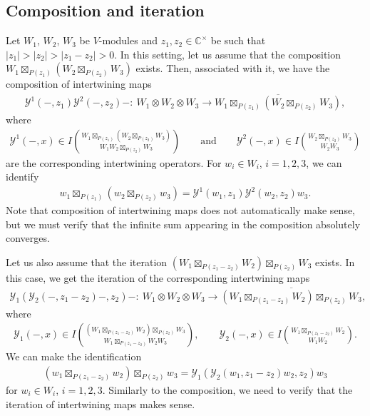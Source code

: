 \documentclass[10pt,a4paper]{amsart}
\numberwithin{equation}{section}
\newcommand{\ol}[1]{\overline{#1}}
\newcommand{\bC}{\mathbb{C}}
\newcommand{\voagen}{V}
\newcommand{\voamodgen}{W}
\newcommand{\voaint}{\mathcal{Y}}
\newcommand{\inttyp}[3]{\binom{#3}{#1 #2}}
\newcommand{\intsp}[3]{I\inttyp{#1}{#2}{#3}}
\newcommand{\vmodvec}{w}
\begin{document}
\subsection{Composition and iteration}
Let $\voamodgen_{1}$, $\voamodgen_{2}$, $\voamodgen_{3}$ be $\voagen$-modules and $z_{1},z_{2}\in \bC^{\times}$ be such that $|z_{1}|>|z_{2}|>|z_{1}-z_{2}|>0$.
In this setting, let us assume that the composition
$
 \voamodgen_{1}\boxtimes_{P(z_{1})}(\voamodgen_{2}\boxtimes_{P(z_{2})}\voamodgen_{3})
$
exists.
Then, associated with it, we have the composition of intertwining maps
\begin{gather*}
 \voaint^{1}(-,z_{1})\voaint^{2}(-,z_{2})-\colon\ \voamodgen_{1}\otimes \voamodgen_{2}\otimes\voamodgen_{3}\to \ol{\voamodgen_{1}\boxtimes_{P(z_{1})}(\voamodgen_{2}\boxtimes_{P(z_{2})}\voamodgen_{3})},
\end{gather*}
where
\begin{gather*}\voaint^{1}(-,x)\in \intsp{\voamodgen_{1}}{\voamodgen_{2}\boxtimes_{P(z_{2})}\voamodgen_{3}}{\voamodgen_{1}\boxtimes_{P(z_{1})}(\voamodgen_{2}\boxtimes_{P(z_{2})}\voamodgen_{3})}\qquad \mbox{and}\qquad
\voaint^{2}(-,x)\in \intsp{\voamodgen_{2}}{\voamodgen_{3}}{\voamodgen_{2}\boxtimes_{P(z_{2})}\voamodgen_{3}}
\end{gather*}
are the corresponding intertwining operators.
For $\vmodvec_{i}\in\voamodgen_{i}$, $i=1,2,3$, we can identify
\begin{gather*}
 \vmodvec_{1}\boxtimes_{P(z_{1})}(\vmodvec_{2}\boxtimes_{P(z_{2})}\vmodvec_{3})=\voaint^{1}(\vmodvec_{1},z_{1})\voaint^{2}(\vmodvec_{2},z_{2})\vmodvec_{3}.
\end{gather*}
Note that composition of intertwining maps does not automatically make sense,
but we must verify that the infinite sum appearing in the composition absolutely converges.

Let us also assume that the iteration
$
 (\voamodgen_{1}\boxtimes_{P(z_{1}-z_{2})}\voamodgen_{2})\boxtimes_{P(z_{2})}\voamodgen_{3}
$
exists.
In this case, we get the iteration of the corresponding intertwining maps
\begin{gather*}
 \voaint_{1} (\voaint_{2}(-,z_{1}-z_{2})-,z_{2} )-\colon\ \voamodgen_{1}\otimes \voamodgen_{2}\otimes \voamodgen_{3}\to \ol{(\voamodgen_{1}\boxtimes_{P(z_{1}-z_{2})}\voamodgen_{2})\boxtimes_{P(z_{2})}\voamodgen_{3}},
\end{gather*}
where
\begin{gather*}
 \voaint_{1}(-,x)\in\intsp{\voamodgen_{1}\boxtimes_{P(z_{1}-z_{2})}\voamodgen_{2}}{\voamodgen_{3}}{(\voamodgen_{1}\boxtimes_{P(z_{1}-z_{2})}\voamodgen_{2})\boxtimes_{P(z_{2})}\voamodgen_{3}},\qquad
 \voaint_{2}(-,x)\in \intsp{\voamodgen_{1}}{\voamodgen_{2}}{\voamodgen_{1}\boxtimes_{P(z_{1}-z_{2})}\voamodgen_{2}}.
\end{gather*}
We can make the identification
\begin{gather*}
 (\vmodvec_{1}\boxtimes_{P(z_{1}-z_{2})}\vmodvec_{2})\boxtimes_{P(z_{2})}\vmodvec_{3}=\voaint_{1}\left(\voaint_{2}(\vmodvec_{1},z_{1}-z_{2})\vmodvec_{2},z_{2}\right)\vmodvec_{3}
\end{gather*}
for $\vmodvec_{i}\in \voamodgen_{i}$, $i=1,2,3$.
Similarly to the composition, we need to verify that the iteration of intertwining maps makes sense.
\end{document}
